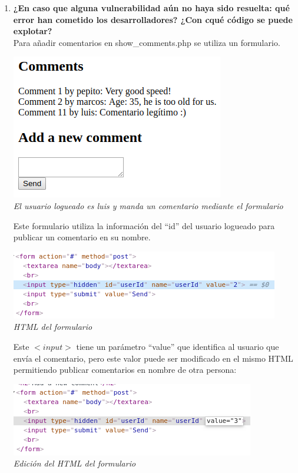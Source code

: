 \documentclass[10pt,a4paper]{article}
\begin{document}
\begin{enumerate}
\item \textbf{¿En caso que alguna vulnerabilidad aún no haya sido resuelta: qué error han
cometido los desarrolladores? ¿Con cqué código se puede explotar?}\\
Para añadir comentarios en show\_comments.php se utiliza un formulario. 

\begin{center}
\includegraphics[scale=0.6]{form3.png}\\
\textit{El usuario logueado es luis y manda un comentario mediante el formulario}
\end{center}

Este formulario utiliza la información del ``id'' del usuario logueado para publicar un comentario en su nombre.

\begin{center}
\includegraphics[scale=0.6]{form2.png}\\
\textit{HTML del formulario}
\end{center}

Este $<input>$ tiene un parámetro ``value'' que identifica al usuario que envía el comentario, pero este valor puede ser modificado en el mismo HTML permitiendo publicar comentarios en nombre de otra persona:

\begin{center}
\includegraphics[scale=0.6]{form4.png}\\
\textit{Edición del HTML del formulario}
\end{center}


\end{enumerate}
\end{document}
